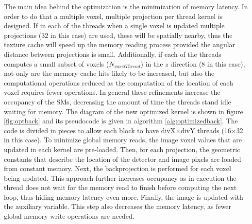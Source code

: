 The main idea behind the optimization is the minimization of memory latency. In order to do that a multiple voxel, multiple projection per thread kernel is designed. If in each of the threads when a single voxel is updated multiple projections (32 in this case) are used, these will be spatially nearby, thus the texture cache will speed up the memory reading process provided the angular distance between projections is small. Additionally, if each of the threads computes a small subset of voxels ($N_{voxelThread}$) in the $z$ direction (8 in this case), not only are the memory cache hits likely to be increased, but also the computational operations reduced as the computation of the location of each voxel requires fewer operations. In general these refinements increase the occupancy of the SMs, decreasing the amount of time the threads stand idle waiting for memory. The diagram of the new optimized kernel is shown in figure \ref{fig:optback} and its pseudocode is given in algorithm \ref{alg:optimizedback}. The code is divided in pieces to allow each block to have divX$\times$divY threads (16$\times$32 in this case). To minimize global memory reads, the image voxel values that are updated in each kernel are pre-loaded. Then, for each projection, the geometric constants that describe the location of the detector and image pixels are loaded from constant memory. Next, the backprojection is performed for each voxel being updated. This approach further increases occupancy as in execution the thread does not wait for the memory read to finish before computing the next loop, thus hiding memory latency even more. Finally, the image is updated with the auxiliary variable. This step also decreases the memory latency, as fewer global memory write operations are needed.


